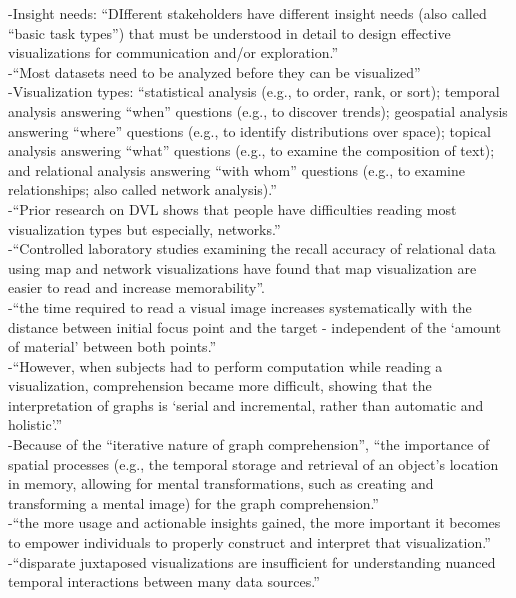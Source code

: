 -{\color{orange}Insight needs: “DIfferent stakeholders have different insight needs (also called “basic task types”) that must be understood in detail to design effective visualizations for communication and/or exploration.”\cite{Borner2019}}\\
-{\color{orange}“Most datasets need to be analyzed before they can be visualized”\cite{Borner2019}}\\
-{\color{orange}Visualization types: “statistical analysis (e.g., to order, rank, or sort); temporal analysis answering “when” questions (e.g., to discover trends); geospatial analysis answering “where” questions (e.g., to identify distributions over space); topical analysis answering “what” questions (e.g., to examine the composition of text); and relational analysis answering “with whom” questions (e.g., to examine relationships; also called network analysis).”\cite{Borner2019}}\\
-{\color{orange}“Prior research on DVL shows that people have difficulties reading most visualization types but especially, networks.”
\cite{Borner2019}}\\
-{\color{orange}“Controlled laboratory studies examining the recall accuracy of relational data using map and network visualizations have found that map visualization are easier to read and increase memorability”.\cite{Borner2019}}\\
-{\color{orange}“the time required to read a visual image increases systematically with the distance between initial focus point and the target - independent of the ‘amount of material’ between both points.”\cite{Borner2019}}\\
-{\color{orange}“However, when subjects had to perform computation while reading a visualization, comprehension became more difficult, showing that the interpretation of graphs is ‘serial and incremental, rather than automatic and holistic’.” \cite{Borner2019}}\\
-{\color{orange}Because of the “iterative nature of graph comprehension”, “the importance of spatial processes (e.g., the temporal storage and retrieval of an object’s location in memory, allowing for mental transformations, such as creating and transforming a mental image) for the graph comprehension.”\cite{Borner2019}}\\
-{\color{orange}“the more usage and actionable insights gained, the more important it becomes to empower individuals to properly construct and interpret that visualization.”\cite{Borner2019}}\\
-{\color{orange}“disparate juxtaposed visualizations are insufficient for understanding nuanced temporal interactions between many data sources.”\cite{Zhang2019}}\\
